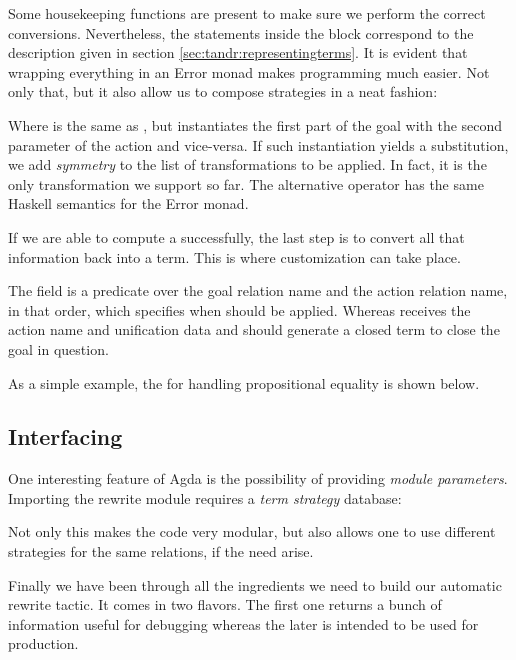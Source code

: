 
Some housekeeping functions are present to make sure we perform the correct
conversions. Nevertheless, the statements inside the  block correspond to the description given in section \ref{sec:tandr:representingterms}. It is
 evident that wrapping everything in an Error monad makes programming much easier. Not only that, but it also allow us to compose strategies in a neat fashion:
 

Where  is the same as , but instantiates the first part of the goal with the second parameter of the action and vice-versa. If such instantiation yields a substitution, we add \emph{symmetry} to the list of
transformations to be applied. In fact, it is the only transformation we support so far. The alternative operator has the same Haskell semantics for
the Error monad.

If we are able to compute a  successfully, the last step is to convert
all that information back into a term. This is where customization can take place.


The  field is a predicate over the goal relation name and the action relation name, in that order, which specifies when  should be applied.
Whereas  receives the action name and unification data and should generate a closed term to close the goal in question.

As a simple example, the  for handling propositional equality is shown below.


\subsection{Interfacing}

One interesting feature of Agda is the possibility of providing \emph{module parameters}. Importing the rewrite module requires a \emph{term strategy} database:


Not only this makes the code very modular, but also allows one to use different strategies for the same relations, if the need arise.

Finally we have been through all the ingredients we need to build our automatic rewrite tactic. It comes in two flavors. The first one
returns a bunch of information useful for debugging whereas the
later is intended to be used for production.


